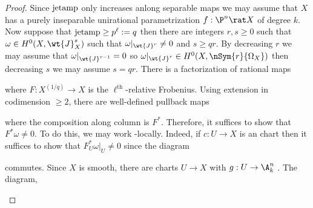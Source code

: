 \documentclass[12pt]{article}
\begin{document}
\begin{proof}
Since $\mathrm{jetamp}$ only increases anlong separable maps we may assume that $X$ has a purely inseparable unirational parametrization $f : \P^n \rat X$ of degree $k$. Now suppose that $\mathrm{jetamp} \ge p^{\ell} := q$ then there are integers $r,s \ge 0$ such that $\omega \in H^0(X, \wt{J}_X^{s})$ such that $\omega|_{\wt{J}^{r}} \neq 0$ and $s \ge q r$. By decreasing $r$ we may assume that $\omega|_{\wt{J}^{r-1}} = 0$ so $\omega|_{\wt{J}^{r}} \in H^0(X, \nSym{r}{\Omega_X})$ then decreasing $s$ we may assume $s = q r$. There is a factorization of rational maps
\begin{center}
\end{center}
where $F : X^{(1/q)} \to X$ is the $\ell^{\text{th}}$-relative Frobenius. 
Using extension in codimension $\ge 2$, there are well-defined pullback maps
\begin{center}
\end{center} 
where the composition along column is $F^*$. Therefore, it suffices to show that $F^* \omega \neq 0$. To do this, we may work \etale-locally. Indeed, if $c : U \to X$ is an \etale chart then it suffices to show that $F_U^* \omega|_U \neq 0$ since the diagram
\begin{center}
\end{center}
commutes. Since $X$ is smooth, there are \etale charts $U \to X$ with $g : U \to \A^n_k$ \etale. The diagram, 
\begin{center}
\end{center}
\end{proof}
\end{document}
